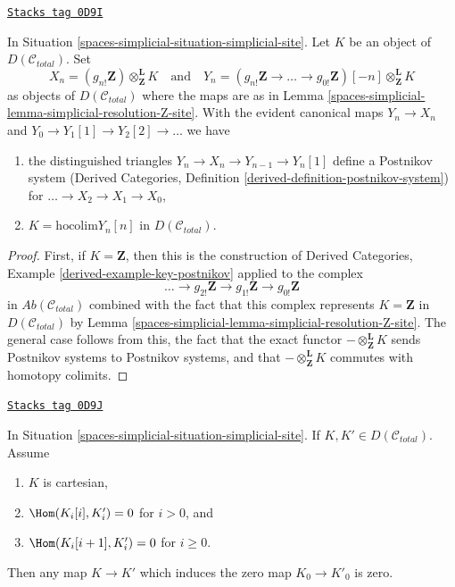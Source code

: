 \begin{lemma}
\label{spaces-simplicial-lemma-abelian-postnikov}
\href{https://stacks.math.columbia.edu/tag/0D9I}{\texttt{Stacks tag 0D9I}}

In Situation \ref{spaces-simplicial-situation-simplicial-site}. Let $K$ be
an object of $D(\mathcal{C}_{total})$. Set
$$
X_n = (g_{n!}\mathbf{Z})
\otimes^\mathbf{L}_\mathbf{Z} K
\quad\text{and}\quad
Y_n =
(g_{n!}\mathbf{Z} \to \ldots \to g_{0!}\mathbf{Z})[-n]
\otimes^\mathbf{L}_\mathbf{Z} K
$$
as objects of $D(\mathcal{C}_{total})$ where the maps are
as in Lemma \ref{spaces-simplicial-lemma-simplicial-resolution-Z-site}.
With the evident canonical maps $Y_n \to X_n$ and
$Y_0 \to Y_1[1] \to Y_2[2] \to \ldots$ we have
\begin{enumerate}
\item the distinguished triangles $Y_n \to X_n \to Y_{n - 1} \to Y_n[1]$
define a Postnikov system
(Derived Categories, Definition \ref{derived-definition-postnikov-system})
for $\ldots \to X_2 \to X_1 \to X_0$,
\item $K = \text{hocolim} Y_n[n]$ in $D(\mathcal{C}_{total})$.
\end{enumerate}
\end{lemma}

\begin{proof}
First, if $K = \mathbf{Z}$, then this is the construction of
Derived Categories, Example \ref{derived-example-key-postnikov}
applied to the complex
$$
\ldots \to
g_{2!}\mathbf{Z} \to
g_{1!}\mathbf{Z} \to
g_{0!}\mathbf{Z}
$$
in $\textit{Ab}(\mathcal{C}_{total})$ combined with the fact that
this complex represents $K = \mathbf{Z}$ in $D(\mathcal{C}_{total})$
by Lemma \ref{spaces-simplicial-lemma-simplicial-resolution-Z-site}.
The general case follows from this, the fact that the exact functor
$- \otimes^\mathbf{L}_\mathbf{Z} K$ sends Postnikov systems to
Postnikov systems, and
that $- \otimes^\mathbf{L}_\mathbf{Z} K$ commutes with homotopy colimits.
\end{proof}

\begin{lemma}
\label{spaces-simplicial-lemma-nullity-cartesian-objects-derived}
\href{https://stacks.math.columbia.edu/tag/0D9J}{\texttt{Stacks tag 0D9J}}

In Situation \ref{spaces-simplicial-situation-simplicial-site}.
If $K, K' \in D(\mathcal{C}_{total})$.
Assume
\begin{enumerate}
\item $K$ is cartesian,
\item $\Hom(K_i[i], K'_i) = 0$ for $i > 0$, and
\item $\Hom(K_i[i + 1], K'_i) = 0$ for $i \geq 0$.
\end{enumerate}
Then any map $K \to K'$ which induces the zero map $K_0 \to K'_0$ is zero.
\end{lemma}

